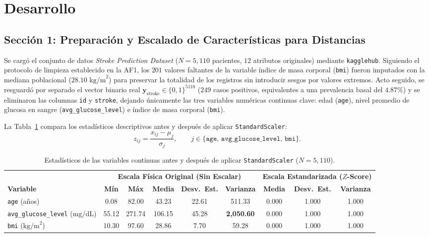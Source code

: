 \section{Desarrollo}

\subsection{Sección 1: Preparación y Escalado de Características para Distancias}

Se cargó el conjunto de datos \textit{Stroke Prediction Dataset} ($N = 5,110$ pacientes, $12$ atributos originales) mediante \texttt{kagglehub}. Siguiendo el protocolo de limpieza establecido en la AF1, los $201$ valores faltantes de la variable índice de masa corporal (\texttt{bmi}) fueron imputados con la mediana poblacional ($28.10\text{ kg/m}^2$) para preservar la totalidad de los registros sin introducir sesgos por valores extremos. Acto seguido, se resguardó por separado el vector binario real $\mathbf{y}_{\text{stroke}} \in \{0, 1\}^{5110}$ ($249$ casos positivos, equivalentes a una prevalencia basal del $4.87\%$) y se eliminaron las columnas \texttt{id} y \texttt{stroke}, dejando únicamente las tres variables numéricas continuas clave: edad (\texttt{age}), nivel promedio de glucosa en sangre (\texttt{avg\_glucose\_level}) e índice de masa corporal (\texttt{bmi}).

La Tabla~\ref{tab:stats_escalado} compara los estadísticos descriptivos antes y después de aplicar \texttt{StandardScaler}:
\begin{equation}
    z_{ij} = \frac{x_{ij} - \mu_j}{\sigma_j}, \qquad j \in \{\texttt{age},\, \texttt{avg\_glucose\_level},\, \texttt{bmi}\}.
\end{equation}

\begin{table}[H]
    \centering
    \caption{Estadísticos de las variables continuas antes y después de aplicar \texttt{StandardScaler} ($N = 5,110$).}
    \label{tab:stats_escalado}
    \begin{tabular}{lccccc|ccc}
        \toprule
        & \multicolumn{5}{c|}{\textbf{Escala Física Original (Sin Escalar)}} & \multicolumn{3}{c}{\textbf{Escala Estandarizada ($Z$-Score)}} \\
        \textbf{Variable} & \textbf{Mín} & \textbf{Máx} & \textbf{Media} & \textbf{Desv.\ Est.} & \textbf{Varianza} & \textbf{Media} & \textbf{Desv.\ Est.} & \textbf{Varianza} \\
        \midrule
        \texttt{age} (años) & 0.08 & 82.00 & 43.23 & 22.61 & 511.33 & 0.000 & 1.000 & 1.000 \\
        \texttt{avg\_glucose\_level} (mg/dL) & 55.12 & 271.74 & 106.15 & 45.28 & \textbf{2,050.60} & 0.000 & 1.000 & 1.000 \\
        \texttt{bmi} ($\text{kg/m}^2$) & 10.30 & 97.60 & 28.86 & 7.70 & 59.28 & 0.000 & 1.000 & 1.000 \\
        \bottomrule
    \end{tabular}
\end{table}

